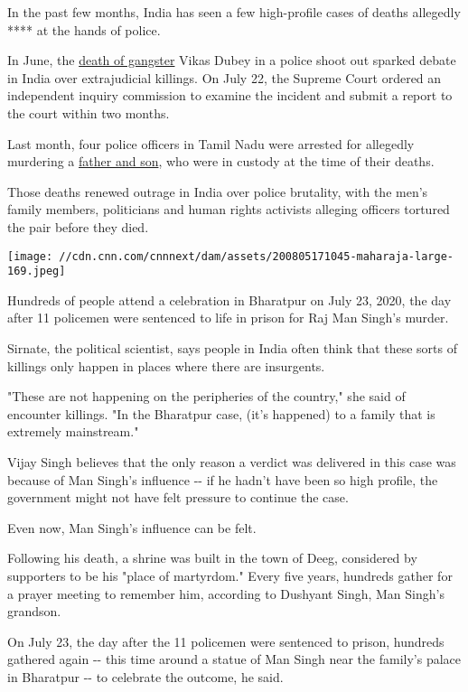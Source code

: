 In the past few months, India has seen a few high-profile cases of
deaths allegedly **** at the hands of police.

In June, the
\href{https://edition.cnn.com/2020/07/10/asia/indian-gangster-shot-dead-intl-hnk-scli/index.html}{death
of gangster} Vikas Dubey in a police shoot out sparked debate in India
over extrajudicial killings. On July 22, the Supreme Court ordered an
independent inquiry commission to examine the incident and submit a
report to the court within two months.

Last month, four police officers in Tamil Nadu were arrested for
allegedly murdering a
\href{https://edition.cnn.com/2020/07/01/asia/tamil-nadu-deaths-custody-intl-hnk/index.html}{father
and son}, who were in custody at the time of their deaths.

Those deaths renewed outrage in India over police brutality, with the
men's family members, politicians and human rights activists alleging
officers tortured the pair before they died.

\texttt{[image: //cdn.cnn.com/cnnnext/dam/assets/200805171045-maharaja-large-169.jpeg]}

Hundreds of people attend a celebration in Bharatpur on July 23, 2020,
the day after 11 policemen were sentenced to life in prison for Raj Man
Singh's murder.

Sirnate, the political scientist, says people in India often think that
these sorts of killings only happen in places where there are
insurgents.

"These are not happening on the peripheries of the country," she said of
encounter killings. "In the Bharatpur case, (it's happened) to a family
that is extremely mainstream."

Vijay Singh believes that the only reason a verdict was delivered in
this case was because of Man Singh's influence -\/- if he hadn't have
been so high profile, the government might not have felt pressure to
continue the case.

Even now, Man Singh's influence can be felt.

Following his death, a shrine was built in the town of Deeg, considered
by supporters to be his "place of martyrdom." Every five years, hundreds
gather for a prayer meeting to remember him, according to Dushyant
Singh, Man Singh's grandson.

On July 23, the day after the 11 policemen were sentenced to prison,
hundreds gathered again -\/- this time around a statue of Man Singh near
the family's palace in Bharatpur -\/- to celebrate the outcome, he said.

